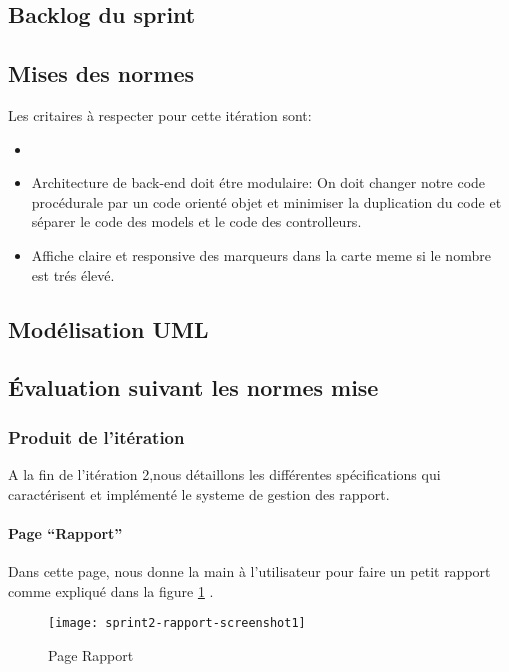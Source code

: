 \subsection{Backlog du sprint}
\subsection{Mises des normes}

Les critaires à respecter pour cette itération sont:

\begin{itemize}
        \item {}
        \item Architecture de back-end doit étre modulaire: On doit changer
            notre code procédurale par un code orienté objet et minimiser la
            duplication du code et séparer le code des models et le code des
            controlleurs.
        \item Affiche claire et responsive des marqueurs dans la carte meme si
            le nombre est trés élevé.
\end{itemize}

\subsection{Modélisation UML}
\subsection{Évaluation suivant les normes mise}
\subsubsection{Produit de l'itération}
A la fin de l'itération 2,nous détaillons les différentes spécifications qui caractérisent et 
implémenté le systeme de gestion des rapport.
\paragraph{Page ``Rapport''}
Dans cette page, nous donne la main à l'utilisateur pour faire un petit rapport comme expliqué dans la
figure \ref{fig:sprint2-rapport-screenshot1} . 
\begin{figure}[htbp]
  \centering
  \texttt{[image: sprint2-rapport-screenshot1]}
  \caption{Page Rapport}
  \label{fig:sprint2-rapport-screenshot1}
\end{figure}
